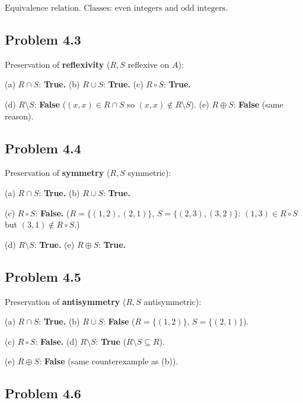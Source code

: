 $\boxed{\text{Equivalence relation. Classes: even integers and odd integers.}}$


\subsection*{Problem 4.3}

Preservation of \textbf{reflexivity} ($R,S$ reflexive on $A$):

(a) $R\cap S$: \textbf{True.} \quad
(b) $R\cup S$: \textbf{True.} \quad
(c) $R\circ S$: \textbf{True.}

(d) $R\setminus S$: \textbf{False} ($(x,x)\in R\cap S$ so $(x,x)\notin R\setminus S$). \quad
(e) $R\oplus S$: \textbf{False} (same reason).


\subsection*{Problem 4.4}

Preservation of \textbf{symmetry} ($R,S$ symmetric):

(a) $R\cap S$: \textbf{True.} \quad
(b) $R\cup S$: \textbf{True.}

(c) $R\circ S$: \textbf{False.} ($R=\{(1,2),(2,1)\}$, $S=\{(2,3),(3,2)\}$: $(1,3)\in R\circ S$ but $(3,1)\notin R\circ S$.)

(d) $R\setminus S$: \textbf{True.} \quad
(e) $R\oplus S$: \textbf{True.}


\subsection*{Problem 4.5}

Preservation of \textbf{antisymmetry} ($R,S$ antisymmetric):

(a) $R\cap S$: \textbf{True.} \quad
(b) $R\cup S$: \textbf{False} ($R=\{(1,2)\}$, $S=\{(2,1)\}$).

(c) $R\circ S$: \textbf{False.} \quad
(d) $R\setminus S$: \textbf{True} ($R\setminus S\subseteq R$).

(e) $R\oplus S$: \textbf{False} (same counterexample as (b)).


\subsection*{Problem 4.6}

